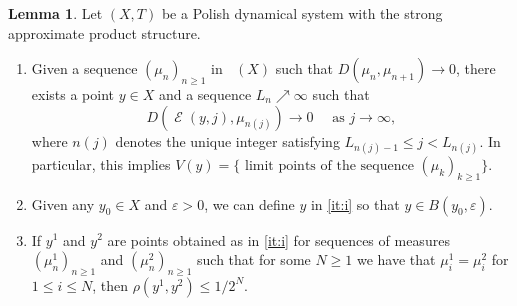 \documentclass{amsart}
\theoremstyle{definition}
\newtheorem{lem}[thm]{Lemma}
\DeclareMathOperator{\Emp}{\mathcal{E}}%
\DeclareMathOperator{\MT}{\mathcal{M}_{\mathit T} }
\newcommand{\eps}{\varepsilon}
\begin{document}
%

\begin{lem} \label{lem:main}
Let $(X, T)$ be a Polish dynamical system with the strong approximate product structure.
\begin{enumerate}
\item \label{it:i} Given a sequence $(\mu_n)_{n \geq 1}$ in $\MT(X)$ such that $D(\mu_n, \mu_{n+1}) \to 0$, there exists a point $y \in X$ and a sequence $L_n \nearrow \infty$ such that
\begin{equation} \label{eqn:lemmain}
D(\Emp(y, j), \mu_{n(j)}) \to 0 \quad \textrm{ as } j \to \infty,
\end{equation}
where $n(j)$ denotes the unique integer satisfying $L_{n(j) - 1} \le j < L_{n(j)}$. In particular, this implies $V(y) = \{ \textrm{ limit points of the sequence } (\mu_k)_{k \geq 1} \}$.
\item \label{it:ii} Given any $y_0 \in X$ and $\eps > 0$, we can define $y$ in \eqref{it:i} so that $y \in B(y_0, \eps)$.
\item \label{it:iii} If $y^{1}$ and $y^{2}$ are points obtained as in \eqref{it:i}  for sequences of measures $( \mu^{1}_n ) _{n \ge 1}$ and $( \mu^{2}_n ) _{n \ge 1}$ such that for some $N\ge 1$ we have that $\mu^{1}_i = \mu^{2}_i$ for $1\le i \le N$,  then $\rho(y^{1}, y^{2}) \le 1 / 2^N$.
\end{enumerate}
\end{lem}
\end{document}

